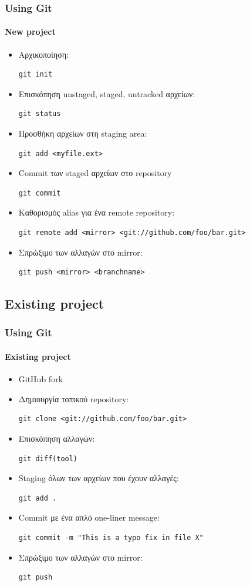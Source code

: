 \documentclass[handout]{beamer}
\begin{document}
\begin{frame}[fragile]
  \frametitle{Using Git}
  \framesubtitle{New project}
  \begin{itemize}
    \item Αρχικοποίηση:
\begin{verbatim}
git init
\end{verbatim}
    \item Επισκόπηση unstaged, staged, untracked αρχείων:
\begin{verbatim}
git status
\end{verbatim}
    \item Προσθήκη αρχείων στη staging area:
\begin{verbatim}
git add <myfile.ext>
\end{verbatim}
    \item Commit των staged αρχείων στο repository
\begin{verbatim}
git commit
\end{verbatim}
    \item Καθορισμός alias για ένα remote repository:
\begin{verbatim}
git remote add <mirror> <git://github.com/foo/bar.git>
\end{verbatim}
    \item Σπρώξιμο των αλλαγών στο mirror:
\begin{verbatim}
git push <mirror> <branchname>
\end{verbatim}
  \end{itemize}
\end{frame}

\subsection{Existing project}

\begin{frame}[fragile]
  \frametitle{Using Git}
  \framesubtitle{Existing project}
  \begin{itemize}
    \item GitHub fork
    \item Δημιουργία τοπικού repository:
\begin{verbatim}
git clone <git://github.com/foo/bar.git>
\end{verbatim}
    \item Επισκόπηση αλλαγών:
\begin{verbatim}
git diff(tool)
\end{verbatim}
    \item Staging όλων των αρχείων που έχουν αλλαγές:
\begin{verbatim}
git add .
\end{verbatim}
    \item Commit με ένα απλό one-liner message:
\begin{verbatim}
git commit -m "This is a typo fix in file X"
\end{verbatim}
    \item Σπρώξιμο των αλλαγών στο mirror:
\begin{verbatim}
git push
\end{verbatim}
  \end{itemize}
\end{frame}
\end{document}
